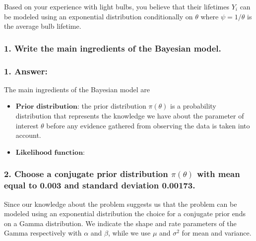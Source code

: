 \documentclass[
]{article}
\providecommand{\tightlist}{%
  \setlength{\itemsep}{0pt}\setlength{\parskip}{0pt}}
\begin{document}
Based on your experience with light bulbs, you believe that their
lifetimes \(Y_i\) can be modeled using an exponential distribution
conditionally on \(\theta\) where \(\psi = 1/\theta\) is the average
bulb lifetime.

\hypertarget{write-the-main-ingredients-of-the-bayesian-model.}{%
\subsubsection{1. Write the main ingredients of the Bayesian
model.}\label{write-the-main-ingredients-of-the-bayesian-model.}}

\hypertarget{answer-4}{%
\subsubsection{1. Answer:}\label{answer-4}}

The main ingredients of the Bayesian model are

\begin{itemize}
\tightlist
\item
  \(\textbf{Prior distribution}\): the prior distribution
  \(\pi(\theta)\) is a probability distribution that represents the
  knowledge we have about the parameter of interest \(\theta\) before
  any evidence gathered from observing the data is taken into account.
\item
  \(\textbf{Likelihood function}\):
\end{itemize}

\hypertarget{choose-a-conjugate-prior-distribution-pitheta-with-mean-equal-to-0.003-and-standard-deviation-0.00173.}{%
\subsubsection{\texorpdfstring{2. Choose a conjugate prior distribution
\(\pi(\theta)\) with mean equal to 0.003 and standard deviation
0.00173.}{2. Choose a conjugate prior distribution \textbackslash pi(\textbackslash theta) with mean equal to 0.003 and standard deviation 0.00173.}}\label{choose-a-conjugate-prior-distribution-pitheta-with-mean-equal-to-0.003-and-standard-deviation-0.00173.}}

Since our knowledge about the problem suggests us that the problem can
be modeled using an exponential distribution the choice for a conjugate
prior ends on a Gamma distribution. We indicate the shape and rate
parameters of the Gamma respectively with \(\alpha\) and \(\beta\),
while we use \(\mu\) and \(\sigma^2\) for mean and variance.
\end{document}
